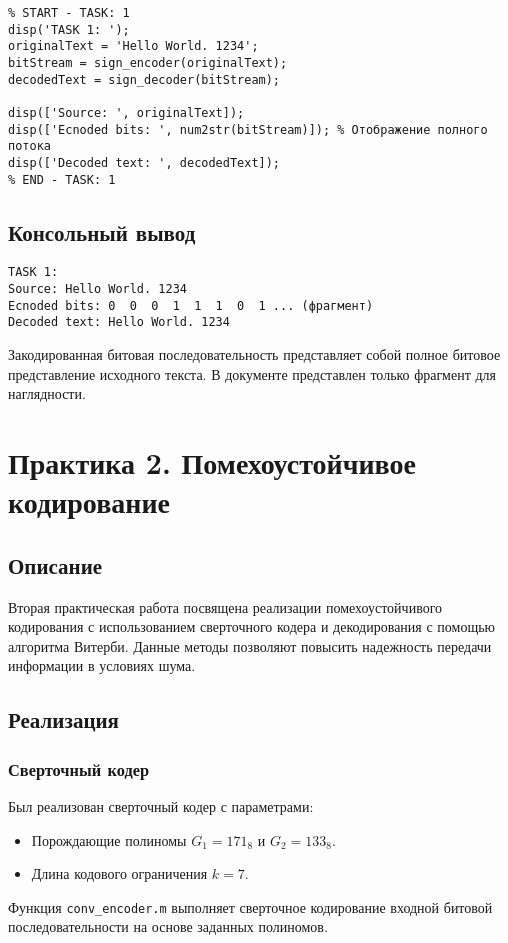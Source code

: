 \begin{verbatim}
% START - TASK: 1
disp('TASK 1: ');
originalText = 'Hello World. 1234';
bitStream = sign_encoder(originalText);
decodedText = sign_decoder(bitStream);

disp(['Source: ', originalText]);
disp(['Ecnoded bits: ', num2str(bitStream)]); % Отображение полного потока
disp(['Decoded text: ', decodedText]);
% END - TASK: 1
\end{verbatim}

\subsection{Консольный вывод}
\begin{verbatim}
TASK 1:
Source: Hello World. 1234
Ecnoded bits: 0  0  0  1  1  1  0  1 ... (фрагмент)
Decoded text: Hello World. 1234
\end{verbatim}
Закодированная битовая последовательность представляет собой полное битовое представление исходного текста. В документе представлен только фрагмент для наглядности.

\section{Практика 2. Помехоустойчивое кодирование}

\subsection{Описание}
Вторая практическая работа посвящена реализации помехоустойчивого кодирования с использованием сверточного кодера и декодирования с помощью алгоритма Витерби. Данные методы позволяют повысить надежность передачи информации в условиях шума.

\subsection{Реализация}
\subsubsection{Сверточный кодер}
Был реализован сверточный кодер с параметрами:
\begin{itemize}
    \item Порождающие полиномы $G_1 = 171_8$ и $G_2 = 133_8$.
    \item Длина кодового ограничения $k = 7$.
\end{itemize}
Функция \texttt{conv\_encoder.m} выполняет сверточное кодирование входной битовой последовательности на основе заданных полиномов.

